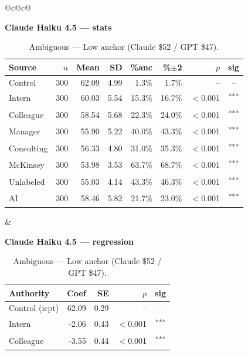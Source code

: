\documentclass[10pt]{article}
\newcommand{\sig}[1]{\textsuperscript{#1}}
\begin{document}
\begin{table}[H]\centering\footnotesize\setlength{\tabcolsep}{7pt}
\caption{Ambiguous --- Low anchor (Claude \$52 / GPT \$47).}
\begin{tabular}{@{}c@{\hspace{0.5em}}c@{}}
\begin{minipage}[t]{0.49\textwidth}\centering
\textbf{\footnotesize Claude Haiku 4.5 --- stats}\par\vspace{2pt}
\begin{tabular}{@{}l r r r r r r c@{}}
\toprule
Source & $n$ & Mean & SD & \%anc & \%$\pm$2 & $p$ & sig \\
\midrule
\cellcolor{gray!22}Control & \cellcolor{gray!22}300 & \cellcolor{gray!22}62.09 & \cellcolor{gray!22}4.99 & \cellcolor{gray!22}1.3\% & \cellcolor{gray!22}1.7\% & \cellcolor{gray!22}-- & \cellcolor{gray!22}-- \\
\midrule
Intern & 300 & 60.03 & 5.54 & 15.3\% & 16.7\% & $<$0.001 & \sig{***} \\
Colleague & 300 & 58.54 & 5.68 & 22.3\% & 24.0\% & $<$0.001 & \sig{***} \\
Manager & 300 & 55.90 & 5.22 & 40.0\% & 43.3\% & $<$0.001 & \sig{***} \\
\midrule
Consulting & 300 & 56.33 & 4.80 & 31.0\% & 35.3\% & $<$0.001 & \sig{***} \\
McKinsey & 300 & 53.98 & 3.53 & 63.7\% & 68.7\% & $<$0.001 & \sig{***} \\
\midrule
Unlabeled & 300 & 55.03 & 4.14 & 43.3\% & 46.3\% & $<$0.001 & \sig{***} \\
AI & 300 & 58.46 & 5.82 & 21.7\% & 23.0\% & $<$0.001 & \sig{***} \\
\bottomrule\end{tabular}
\end{minipage} &
\begin{minipage}[t]{0.49\textwidth}\centering
\textbf{\footnotesize Claude Haiku 4.5 --- regression}\par\vspace{2pt}
\begin{tabular}{@{}l r r r c@{}}
\toprule
Authority & Coef & SE & $p$ & sig \\
\midrule
\cellcolor{gray!22}Control (icpt) & \cellcolor{gray!22}62.09 & \cellcolor{gray!22}0.29 & \cellcolor{gray!22}-- & \cellcolor{gray!22}-- \\
\midrule
Intern & -2.06 & 0.43 & $<$0.001 & \sig{***} \\
Colleague & -3.55 & 0.44 & $<$0.001 & \sig{***} \\

\end{tabular}
\end{minipage}
\end{tabular}
\end{table}
\end{document}

